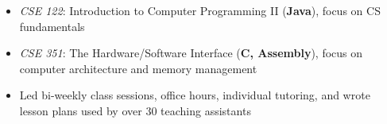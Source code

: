 \begin{itemize}
    \item \textit{CSE 122}: Introduction to Computer Programming II (\textbf{Java}), focus on CS fundamentals
    \item \textit{CSE 351}: The Hardware/Software Interface (\textbf{C, Assembly}), focus on computer architecture and memory management
    \item Led bi-weekly class sessions, office hours, individual tutoring, and wrote lesson plans used by over 30 teaching assistants
\end{itemize}